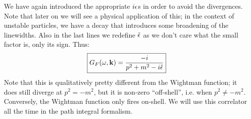 We have again introduced the appropriate $i\epsilon$s in order to avoid the divergences. Note that later on we will see a physical application of this; in the context of unstable particles, we have a decay that introduces some broadening of the linewidths. Also in the last lines we redefine $\tilde{\epsilon}$ as we don't care what the small factor is, only its sign. Thus:
\begin{equation}
    \boxed{G_F(\omega, \mathbf{k}) = \frac{-i}{p^2 + m^2 - i\tilde{\epsilon}}}
\end{equation}
Note that this is qualitatively pretty different from the Wightman function; it does still diverge at $p^2 = -m^2$, but it is non-zero ``off-shell'', i.e. when $p^2 \neq -m^2$. Conversely, the Wightman function only fires on-shell. We will use this correlator all the time in the path integral formalism.